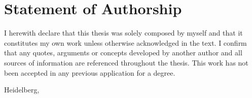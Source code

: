 \makeatletter

\cleardoublepage
\chapter*{Statement of Authorship}

I herewith declare that this thesis was solely composed by myself and that it constitutes my own work unless otherwise acknowledged in the text. I confirm that any quotes, arguments or concepts developed by another author and all sources of information are referenced throughout the thesis. This work has not been accepted in any previous application for a degree.

\vspace{1cm}

\par\noindent%
Heidelberg, \@date \hfill\makebox[2.0in]{\hrulefill}%
\vspace{-\parskip}\par\noindent%
\hfill{}

\makeatother